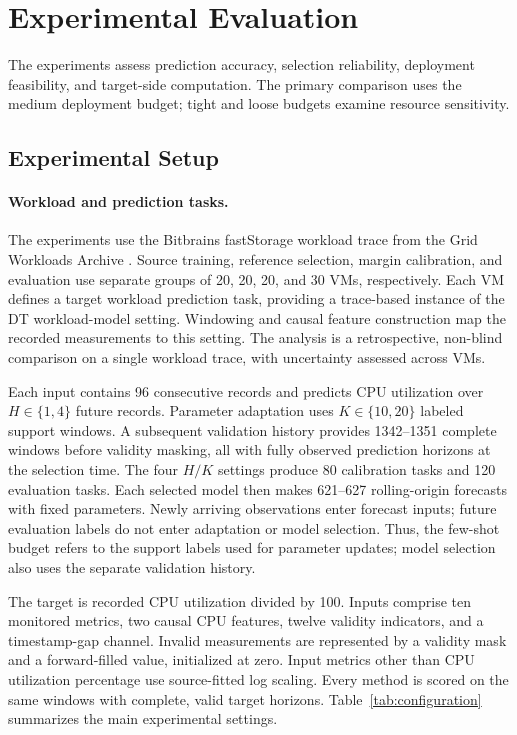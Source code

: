 \documentclass[a4paper,fleqn]{cas-sc}
\begin{document}
\section{Experimental Evaluation}
\label{sec:experiments}
The experiments assess prediction accuracy, selection reliability, deployment
feasibility, and target-side computation. The primary comparison uses the
medium deployment budget; tight and loose budgets examine resource sensitivity.

\subsection{Experimental Setup}
\label{subsec:experimental-setup}
\paragraph{Workload and prediction tasks.}
The experiments use the Bitbrains fastStorage workload trace from the Grid
Workloads Archive \cite{refBitbrains,refGWA}. Source training, reference
selection, margin calibration, and evaluation use separate groups of 20, 20,
20, and 30 VMs, respectively. Each VM defines a target workload prediction
task, providing a trace-based instance of the DT workload-model setting.
Windowing and causal feature construction map the recorded measurements to
this setting. The analysis is a retrospective, non-blind comparison on a single
workload trace, with uncertainty assessed across VMs.

Each input contains 96 consecutive records and predicts CPU utilization over
$H\in\{1,4\}$ future records. Parameter adaptation uses $K\in\{10,20\}$
labeled support windows. A subsequent validation history provides
1342--1351 complete windows before validity masking, all with fully observed
prediction horizons at the selection time. The four $H/K$ settings produce
80 calibration tasks and 120 evaluation tasks. Each selected model then makes
621--627 rolling-origin forecasts with fixed parameters. Newly arriving
observations enter forecast inputs; future evaluation labels do not enter
adaptation or model selection. Thus, the few-shot budget refers to the
support labels used for parameter updates; model selection also uses the
separate validation history.

The target is recorded CPU utilization divided by 100. Inputs comprise ten
monitored metrics, two causal CPU features, twelve validity indicators, and
a timestamp-gap channel. Invalid measurements are represented by a validity
mask and a forward-filled value, initialized at zero. Input metrics other than
CPU utilization percentage use source-fitted log scaling. Every method is
scored on the same windows with complete, valid target horizons.
Table~\ref{tab:configuration} summarizes the main experimental settings.
\end{document}
